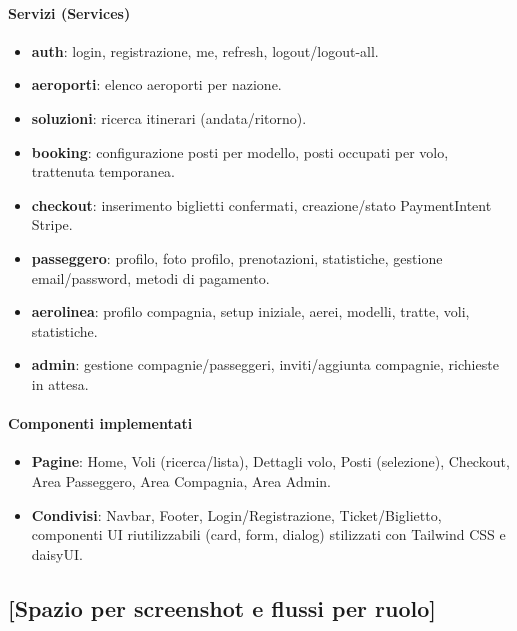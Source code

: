 \documentclass[12pt,a4paper]{article}
\begin{document}
\paragraph{Servizi (Services)}
\begin{itemize}[noitemsep]
	\item \textbf{auth}: login, registrazione, me, refresh, logout/logout-all.
	\item \textbf{aeroporti}: elenco aeroporti per nazione.
	\item \textbf{soluzioni}: ricerca itinerari (andata/ritorno).
	\item \textbf{booking}: configurazione posti per modello, posti occupati per volo, trattenuta temporanea.
	\item \textbf{checkout}: inserimento biglietti confermati, creazione/stato PaymentIntent Stripe.
	\item \textbf{passeggero}: profilo, foto profilo, prenotazioni, statistiche, gestione email/password, metodi di pagamento.
	\item \textbf{aerolinea}: profilo compagnia, setup iniziale, aerei, modelli, tratte, voli, statistiche.
	\item \textbf{admin}: gestione compagnie/passeggeri, inviti/aggiunta compagnie, richieste in attesa.
\end{itemize}

\paragraph{Componenti implementati}
\begin{itemize}[noitemsep]
	\item \textbf{Pagine}: Home, Voli (ricerca/lista), Dettagli volo, Posti (selezione), Checkout, Area Passeggero, Area Compagnia, Area Admin.
	\item \textbf{Condivisi}: Navbar, Footer, Login/Registrazione, Ticket/Biglietto, componenti UI riutilizzabili (card, form, dialog) stilizzati con Tailwind CSS e daisyUI.
\end{itemize}

\subsection*{[Spazio per screenshot e flussi per ruolo]}
\begin{center}
\end{center}
\end{document}
